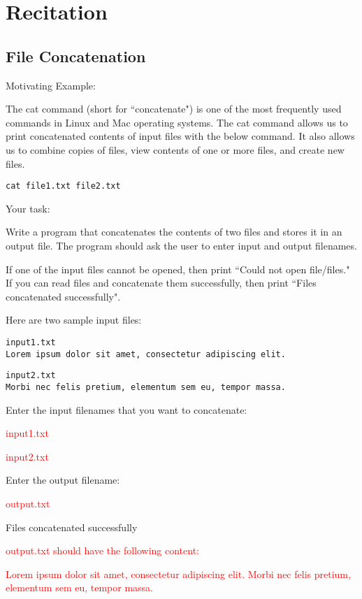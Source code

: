 \section{Recitation}

\subsection{File Concatenation}
Motivating Example:

The cat command (short for ``concatenate") is one of the most frequently used commands in Linux and Mac operating systems. The cat command allows us to print concatenated contents of input files with the below command. It also allows us to combine copies of files, view contents of one or more files, and create new files.
\begin{verbatim}
cat file1.txt file2.txt
\end{verbatim}
Your task:

Write a program that concatenates the contents of two files and stores it in an output file. The program should ask the user to enter input and output filenames.

If one of the input files cannot be opened, then print ``Could not open file/files." If you can read files and concatenate them successfully, then print ``Files concatenated successfully".

Here are two sample input files:

\begin{verbatim}
input1.txt
Lorem ipsum dolor sit amet, consectetur adipiscing elit.
\end{verbatim}



\begin{verbatim}
input2.txt
Morbi nec felis pretium, elementum sem eu, tempor massa.
\end{verbatim}

\begin{sample}

Enter the input filenames that you want to concatenate:

\textcolor{red}{input1.txt}

\textcolor{red}{input2.txt}

Enter the output filename:

\textcolor{red}{output.txt}

Files concatenated successfully

\textcolor{red}{output.txt should have the following content:}

\textcolor{red}{Lorem ipsum dolor sit amet, consectetur adipiscing elit. Morbi nec felis pretium, elementum sem eu, tempor massa.}

\end{sample}


